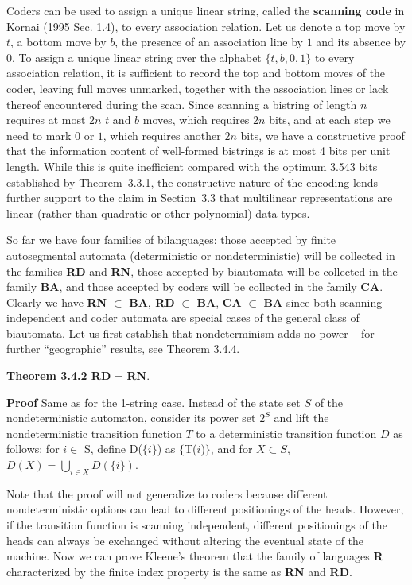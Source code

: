 \smallskip \noindent Coders can be used to assign a unique linear string,
called the {\bf scanning code} in Kornai (1995
Sec. 1.4), to every association relation.  Let us denote a top move by $t$, a
bottom move by $b$, the presence of an association line by $1$ and its absence
by $0$. To assign a unique linear string over the alphabet $\{t,b,0,1\}$ to
every association relation, it is sufficient to record the top and bottom
moves of the coder, leaving full moves unmarked, together with the association
lines or lack thereof encountered during the scan.  Since scanning a bistring
of length $n$ requires at most $2n$ $t$ and $b$ moves, which requires $2n$
bits, and at each step we need to mark $0$ or $1$, which requires another $2n$
bits, we have a constructive proof that the information content of well-formed
bistrings is at most 4 bits per unit length. While this is quite inefficient
compared with the optimum 3.543 bits established by Theorem~3.3.1, the
constructive nature of the encoding lends further support to the claim in
Section~3.3 that multilinear representations are linear (rather than quadratic
or other polynomial) data types.\nocite{Kornai:1995}

So far we have four families of bilanguages: those accepted by finite
autosegmental automata (deterministic or nondeterministic) will be collected
in the families {\bf RD} and {\bf RN}, those accepted by biautomata will be
collected in the family {\bf BA}, and those accepted by coders will be
collected in the family {\bf CA}.  Clearly we have {\bf RN} $\subset$ {\bf
BA}$,\ ${\bf RD} $\subset$ {\bf BA}, {\bf CA } $\subset$ {\bf BA} since both
scanning independent and coder automata are special cases of the general class
of biautomata. Let us first establish that nondeterminism adds no power -- for
further ``geographic'' results, see Theorem 3.4.4.

\smallskip\noindent
{\bf Theorem 3.4.2 RD} = {\bf RN}.

\smallskip\noindent
{\bf Proof} Same as for the 1-string case. Instead of the state set $S$ of
the nondeterministic automaton, consider its power set $2^S$ and lift the
nondeterministic transition function $T$ to a deterministic transition
function $D$ as follows: for $i \in$ S, define D($\{i\}$) as
$\{$T($i$)$\}$, and for $X\subset S,$ $D(X) = \bigcup_{i \in X}
D(\{i\})$. 

\medskip\noindent
Note that the proof will not generalize to coders because different
nondeterministic options can lead to different positionings of the
heads. However, if the transition function is scanning independent, different
positionings of the heads can always be exchanged without altering the
eventual state of the machine.  Now we can prove Kleene's theorem that the
family of languages {\bf R} characterized by the finite index property is the
same as {\bf RN} and {\bf RD}.

